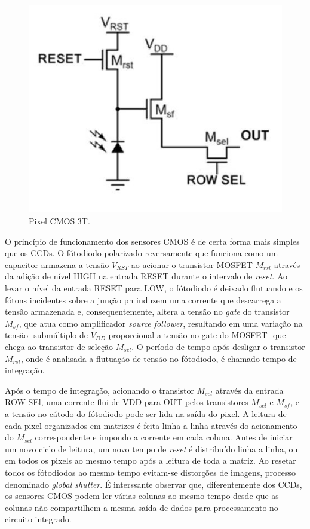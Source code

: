 \documentclass[10pt,a4paper,twocolumn]{article}
\begin{document}
	\begin{figure}[!h]
		\centering
		\includegraphics[scale=0.09]{imagens/cmos_3t.jpg}
		\caption{Pixel CMOS 3T.}
	\end{figure}
	
	O princípio de funcionamento dos sensores CMOS é de certa forma mais simples que os CCDs. O fótodiodo polarizado reversamente que funciona como um capacitor armazena a tensão $V_{RST}$ ao acionar o transistor MOSFET $M_{rst}$ através da adição de nível HIGH na entrada RESET durante o intervalo de \textit{reset}. Ao levar o nível da entrada RESET para LOW, o fótodiodo é deixado flutuando e os fótons incidentes sobre a junção pn induzem uma corrente que descarrega a tensão armazenada e, consequentemente, altera a tensão no \textit{gate} do transistor $M_{sf}$, que atua como amplificador \textit{source follower}, resultando em uma variação na tensão -submúltiplo de $V_{DD}$ proporcional a tensão no gate do MOSFET- que chega ao transistor de seleção $M_{sel}$. O período de tempo após desligar o transistor $M_{rst}$, onde é analisada a flutuação de tensão no fótodiodo, é chamado tempo de integração.
	
	Após o tempo de integração, acionando o transistor $M_{sel}$ através da entrada ROW SEl, uma corrente flui de VDD para OUT pelos transistores $M_{sel}$ e $M_{sf}$, e a tensão no cátodo do fótodiodo pode ser lida na saída do pixel. A leitura de cada pixel organizados em matrizes é feita linha a linha através do acionamento do $M_{sel}$ correspondente e impondo a corrente em cada coluna. Antes de iniciar um novo ciclo de leitura, um novo tempo de \textit{reset} é distribuído linha a linha, ou em todos os pixels ao mesmo tempo após a leitura de toda a matriz. Ao resetar todos os fótodiodos ao mesmo tempo evitam-se distorções de imagens, processo denominado \textit{global shutter}. É interssante observar que, diferentemente dos CCDs, os sensores CMOS podem ler várias colunas ao mesmo tempo desde que as colunas não compartilhem a mesma saída de dados para processamento no circuito integrado.
	
\end{document}
